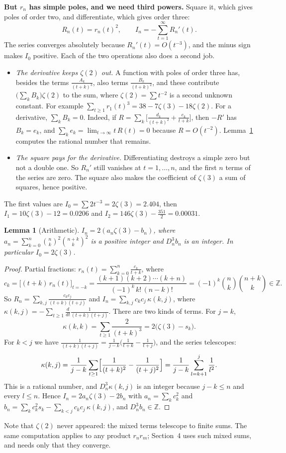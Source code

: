 \documentclass[11pt]{article}
\newcommand{\Z}{\mathbb Z}
\newtheorem{lemma}{Lemma}
\newcommand{\q}[1]{\medskip\noindent\textbf{#1}}
\begin{document}
\q{But $r_n$ has simple poles, and we need third powers.} Square it, which gives poles of order two,
and differentiate, which gives order three:
\[
R_n(t)=r_n(t)^2,\qquad I_n=-\sum_{t=1}^\infty R_n'(t).
\]
The series converges absolutely because $R_n'(t)=O(t^{-3})$, and the minus sign makes $I_0$
positive. Each of the two operations also does a second job.
\begin{itemize}
\item \emph{The derivative keeps $\zeta(2)$ out.} A function with poles of order three has, besides
the terms $\frac{A_k}{(t+k)^3}$, also terms $\frac{B_k}{(t+k)^2}$, and these contribute
$\bigl(\sum_kB_k\bigr)\zeta(2)$ to the sum, where $\zeta(2)=\sum t^{-2}$ is a second unknown
constant. For example $\sum_{t\ge1}r_1(t)^3=38-7\zeta(3)-18\zeta(2)$. For a derivative,
$\sum_kB_k=0$. Indeed, if $R=\sum_k\bigl[\frac{d_k}{(t+k)^2}+\frac{e_k}{t+k}\bigr]$, then $-R'$ has
$B_k=e_k$, and $\sum_ke_k=\lim_{t\to\infty}t\,R(t)=0$ because $R=O(t^{-2})$.
Lemma~\ref{lem:arith} computes the rational number that remains.
\item \emph{The square pays for the derivative.} Differentiating destroys a simple zero but not a
double one. So $R_n'$ still vanishes at $t=1,\dots,n$, and the first $n$ terms of the series are
zero. The square also makes the coefficient of $\zeta(3)$ a sum of squares, hence positive.
\end{itemize}
The first values are $I_0=\sum2t^{-3}=2\zeta(3)=2.404$, then $I_1=10\zeta(3)-12=0.0206$ and
$I_2=146\zeta(3)-\frac{351}2=0.00031$.

\begin{lemma}[Arithmetic]\label{lem:arith}
$I_n=2(a_n\zeta(3)-b_n)$, where $a_n=\sum_{k=0}^n\binom nk^2\binom{n+k}k^2$ is a positive integer
and $D_n^3b_n$ is an integer. In particular $I_0=2\zeta(3)$.
\end{lemma}
\begin{proof}
Partial fractions: $r_n(t)=\sum_{k=0}^n\frac{c_k}{t+k}$, where
\[
c_k=\bigl[(t+k)\,r_n(t)\bigr]_{t=-k}=\frac{(k+1)(k+2)\cdots(k+n)}{(-1)^k\,k!\,(n-k)!}
=(-1)^k\binom nk\binom{n+k}k\in\Z .
\]
So $R_n=\sum_{k,j}\frac{c_kc_j}{(t+k)(t+j)}$ and $I_n=\sum_{k,j}c_kc_j\,\kappa(k,j)$, where
$\kappa(k,j)=-\sum_{t\ge1}\frac{d}{dt}\frac1{(t+k)(t+j)}$. There are two kinds of terms. For $j=k$,
\[
\kappa(k,k)=\sum_{t\ge1}\frac2{(t+k)^3}=2\bigl(\zeta(3)-s_k\bigr).
\]
For $k<j$ we have $\frac1{(t+k)(t+j)}=\frac1{j-k}\bigl(\frac1{t+k}-\frac1{t+j}\bigr)$, and the
series telescopes:
\[
\kappa(k,j)=\frac1{j-k}\sum_{t\ge1}\Bigl[\frac1{(t+k)^2}-\frac1{(t+j)^2}\Bigr]
=\frac1{j-k}\sum_{l=k+1}^{j}\frac1{l^2}.
\]
This is a rational number, and $D_n^3\kappa(k,j)$ is an integer because $j-k\le n$ and every
$l\le n$. Hence $I_n=2a_n\zeta(3)-2b_n$ with $a_n=\sum_kc_k^2$ and
$b_n=\sum_kc_k^2s_k-\sum_{k<j}c_kc_j\,\kappa(k,j)$, and $D_n^3b_n\in\Z$.
\end{proof}
\noindent Note that $\zeta(2)$ never appeared: the mixed terms telescope to finite sums. The same
computation applies to any product $r_nr_m$; Section~4 uses such mixed sums, and needs only that
they converge.
\end{document}
